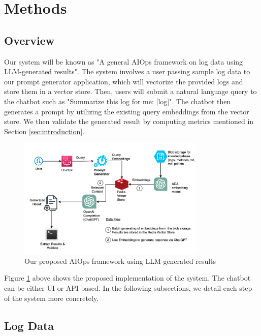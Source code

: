 \documentclass[conference]{IEEEtran}
\begin{document}
\section{Methods}

\subsection{Overview}

Our system will be known as "A general AIOps framework on log data using LLM-generated results". The system involves a user passing sample log data to our prompt generator application, which will vectorize the provided logs and store them in a vector store. Then, users will submit a natural language query to the chatbot such as "Summarize this log for me: [log]". The chatbot then generates a prompt by utilizing the existing query embeddings from the vector store. We then validate the generated result by computing metrics mentioned in Section \ref{sec:introduction}.

\begin{figure}[ht]
    \centering
    \includegraphics[width=0.8\textwidth]{arch.png}
    \caption{Our proposed AIOps framework using LLM-generated results}
    \label{fig:arch}
\end{figure}

Figure \ref{fig:arch} above shows the proposed implementation of the system. The chatbot can be either UI or API based. In the following subsections, we detail each step of the system more concretely.


\subsection{Log Data}
\end{document}
